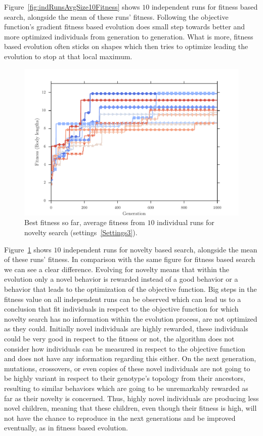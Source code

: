 Figure~\ref{fig:indRunsAvgSize10Fitness} shows $10$ independent runs for fitness based search, alongside the mean of these runs' fitness. Following the objective function's gradient fitness based evolution does small step towards better and more optimized individuals from generation to generation. What is more, fitness based evolution often sticks on shapes which then tries to optimize leading the evolution to stop at that local maximum.

\begin{figure}[ht!]
\centering
\includegraphics[width=1.0\textwidth]{../Figures/Results/indRunnAvgSize7Novelty.pdf}
\caption{Best fitness so far, average fitness from $10$ individual runs for novelty search (settings~\ref{Settings3}).}
\label{fig:indRunnAvgSize10Novelty}
\end{figure}

Figure~\ref{fig:indRunnAvgSize10Novelty} shows $10$ independent runs for novelty based search, alongside the mean of these runs' fitness. In comparison with the same figure for fitness based search we can see a clear difference. Evolving for novelty means that within the evolution only a novel behavior is rewarded instead of a good behavior or a behavior that leads to the optimization of the objective function. Big steps in the fitness value on all independent runs can be observed which can lead us to a conclusion that fit individuals in respect to the objective function for which novelty search has no information within the evolution process, are not optimized as they could. Initially novel individuals are highly rewarded, these individuals could be very good in respect to the fitness or not, the algorithm does not consider how individuals can be measured in respect to the objective function and does not have any information regarding this either. On the next generation, mutations, crossovers, or even copies of these novel individuals are not going to be highly variant in respect to their genotype's topology from their ancestors, resulting to similar behaviors which are going to be unremarkably rewarded as far as their novelty is concerned. Thus, highly novel individuals are producing less novel children, meaning that these children, even though their fitness is high, will not have the chance to reproduce in the next generations and be improved eventually, as in fitness based evolution.


